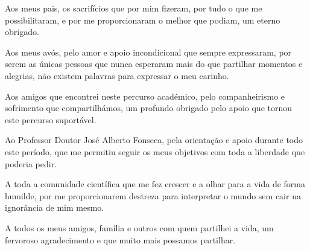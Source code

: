 Aos meus pais, os sacrifícios que por mim fizeram, por tudo o que me possibilitaram, e por me proporcionaram o melhor que podiam, um eterno obrigado.

Aos meus avós, pelo amor e apoio incondicional que sempre expressaram, por serem as únicas pessoas que nunca esperaram mais do que partilhar momentos e alegrias, não existem palavras para expressar o meu carinho.

Aos amigos que encontrei neste percurso académico, pelo companheirismo e sofrimento que compartilhámos, um profundo obrigado pelo apoio que tornou este percurso suportável.

Ao Professor Doutor José Alberto Fonseca, pela orientação e apoio durante todo este período, que me permitiu seguir os meus objetivos com toda a liberdade que poderia pedir.

A toda a comunidade científica que me fez crescer e a olhar para a vida de forma humilde, por me proporcionarem destreza para interpretar o mundo sem cair na ignorância de mim mesmo.

A todos os meus amigos, família e outros com quem partilhei a vida, um fervoroso agradecimento e que muito mais possamos partilhar.
